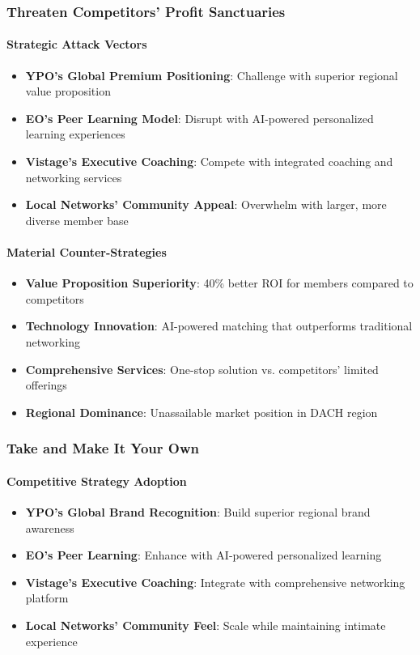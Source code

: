 \subsubsection{Threaten Competitors' Profit Sanctuaries}

\paragraph{Strategic Attack Vectors}
\begin{itemize}
    \item \textbf{YPO's Global Premium Positioning}: Challenge with superior regional value proposition
    \item \textbf{EO's Peer Learning Model}: Disrupt with AI-powered personalized learning experiences
    \item \textbf{Vistage's Executive Coaching}: Compete with integrated coaching and networking services
    \item \textbf{Local Networks' Community Appeal}: Overwhelm with larger, more diverse member base
\end{itemize}

\paragraph{Material Counter-Strategies}
\begin{itemize}
    \item \textbf{Value Proposition Superiority}: 40\% better ROI for members compared to competitors
    \item \textbf{Technology Innovation}: AI-powered matching that outperforms traditional networking
    \item \textbf{Comprehensive Services}: One-stop solution vs. competitors' limited offerings
    \item \textbf{Regional Dominance}: Unassailable market position in DACH region
\end{itemize}

\subsubsection{Take and Make It Your Own}

\paragraph{Competitive Strategy Adoption}
\begin{itemize}
    \item \textbf{YPO's Global Brand Recognition}: Build superior regional brand awareness
    \item \textbf{EO's Peer Learning}: Enhance with AI-powered personalized learning
    \item \textbf{Vistage's Executive Coaching}: Integrate with comprehensive networking platform
    \item \textbf{Local Networks' Community Feel}: Scale while maintaining intimate experience
\end{itemize}

